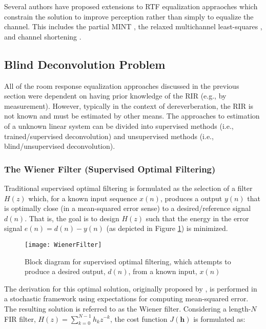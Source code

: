 Several authors have proposed extensions to RTF equalization appraoches which constrain the solution to improve perception rather than simply to equalize the channel. This includes the partial MINT \citep[i.e., PMINT][]{kodrasi2012robust}, the relaxed multichannel least-squares \citep{zhang2010use}, and channel shortening \citep{kallinger2006multi}.


\subsection{Blind Deconvolution Problem}

All of the room response equalization approaches discussed in the previous section were dependent on having prior knowledge of the RIR (e.g., by measurement). However, typically in the context of dereverberation, the RIR is not known and must be estimated by other means. The approaches to estimation of a unknown linear system can be divided into supervised methods (i.e., trained/supervised deconvolution) and unsupervised methods (i.e., blind/unsupervised deconvolution).

\subsubsection{The Wiener Filter (Supervised Optimal Filtering)} \label{wiener_filter}

Traditional supervised optimal filtering is formulated as the selection of a filter $H(z)$ which, for a known input sequence $x(n)$, produces a output $y(n)$ that is optimally close (in a mean-squared error sense) to a desired/reference signal $d(n)$. That is, the goal is to design $H(z)$ such that the energy in the error signal $e(n) = d(n)-y(n)$ (as depicted in Figure \ref{fig:WienerFilterProblem}) is minimized. 

\begin{figure}[H]
	\texttt{[image: WienerFilter]}
	\centering
	\caption[Block Diagram for the Wiener filtering problem]{Block diagram for supervised optimal filtering, which attempts to produce a desired output, $d(n)$, from a known input, $x(n)$}
	\label{fig:WienerFilterProblem}
\end{figure}

The derivation for this optimal solution, originally proposed by \cite{wiener1949extrapolation}, is performed in a stochastic framework using expectations for computing mean-squared error. The resulting solution is referred to as the Wiener filter. Considering a length-$N$ FIR filter, $H(z)=\sum_{k=0}^{N-1}h_k z^{-k}$, the cost function $J(\boldsymbol{h})$ is formulated as:

